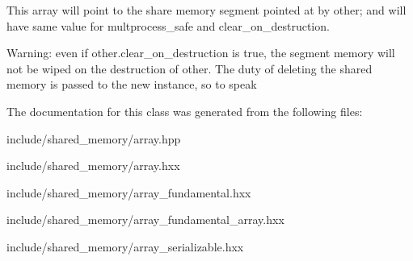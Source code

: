 This array will point to the share memory segment pointed at by other; and will have same value for multprocess\+\_\+safe and clear\+\_\+on\+\_\+destruction. 

Warning\+: even if other.\+clear\+\_\+on\+\_\+destruction is true, the segment memory will not be wiped on the destruction of other. The duty of deleting the shared memory is passed to the new instance, so to speak 

The documentation for this class was generated from the following files\+:\begin{DoxyCompactItemize}
\item 
include/shared\+\_\+memory/array.\+hpp\item 
include/shared\+\_\+memory/array.\+hxx\item 
include/shared\+\_\+memory/array\+\_\+fundamental.\+hxx\item 
include/shared\+\_\+memory/array\+\_\+fundamental\+\_\+array.\+hxx\item 
include/shared\+\_\+memory/array\+\_\+serializable.\+hxx\end{DoxyCompactItemize}
